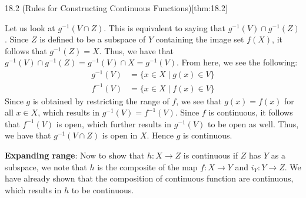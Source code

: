 \begin{thmBox}{18.2 (Rules for Constructing Continuous Functions)}[thm:18.2]
\begin{proofBox}
        Let us look at \( g^{ -1 } ( V \cap Z ) \).
        This is equivalent to saying that \( g^{ -1 } ( V ) \cap 
        g^{ -1 } ( Z ) \).
        Since \( Z \) is defined to be a subspace of \( Y \) containing the 
        image set \( f ( X ) \), it follows that \( g^{ -1 } ( Z ) = X \).
        Thus, we have that \( g^{ -1 } ( V ) \cap g^{ -1 } ( Z ) = 
        g^{ -1 } ( V ) \cap X = g^{ -1 } ( V ) \).
        From here, we see the following:
        \begin{equation*}
            \begin{aligned}
                g^{ -1 } ( V )
                &= 
                \{ x \in X \mid g ( x ) \in V \}
                \\
                f^{ -1 } ( V )
                &= 
                \{ x \in X \mid f ( x ) \in V \}
            \end{aligned}
        \end{equation*}
        Since \( g \) is obtained by restricting the range of \( f \), we see 
        that \( g ( x ) = f ( x ) \) for all \( x \in X \), which results in 
        \( g^{ -1 } ( V ) = f^{ -1 } ( V ) \).
        Since \( f \) is continuous, it follows that \( f^{ -1 } ( V ) \) is 
        open, which further results in \( g^{ -1 } ( V ) \) to be open as well.
        Thus, we have that \( g^{ -1 } ( V \cap Z ) \) is open in \( X \).
        Hence \( g \) is continuous.

        \baseSkip

        \textbf{Expanding range}:
        Now to show that \( h: X \rightarrow Z \) is continuous if \( Z \) has 
        \( Y \) as a subspace, we note that \( h \) is the composite of the 
        map \( f: X \rightarrow Y \) and \( i_{ Y }: Y \rightarrow Z \).
        We have already shown that the composition of continuous function are 
        continuous, which results in \( h \) to be continuous.

        \baseSkip



\end{proofBox}
\end{thmBox}
